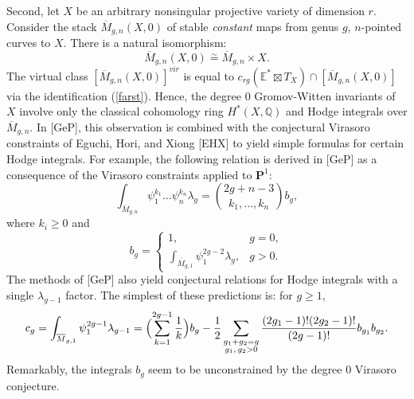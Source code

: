 \documentclass[11 pt]{amsart}
\newcommand{\proj}{\mathbf P}
\newcommand{\Q}{\mathbb{Q}}
\newcommand{\eqq}{\stackrel{\sim}{=}}
\newcommand{\mgn}{\overline{M}_{g,n}}
\newcommand{\hodge}{\mathbb{E}}
\begin{document}
Second, let $X$ be an arbitrary nonsingular projective
variety of dimension $r$. Consider the stack $\overline{M}_{g,n}(X, 0)$
of stable {\em constant} maps from genus $g$, $n$-pointed curves to $X$.
There is a natural isomorphism:
\begin{equation}
\label{farst}
\overline{M}_{g,n}(X, 0) \eqq \mgn \times X.
\end{equation}
The virtual class $[\overline{M}_{g,n}(X, 0)]^{{vir}}$
is equal to $c_{rg}(\hodge^* \boxtimes T_X) \cap [ \overline{M}_{g,n}(X, 0)]$
via the identification (\ref{farst}). 
Hence, the degree $0$ Gromov-Witten invariants of $X$ involve only
the classical cohomology ring $H^*(X, \Q)$ and Hodge integrals
over $\mgn$. 
In [GeP], this observation is combined with the conjectural
Virasoro constraints 
of Eguchi, Hori, and Xiong [EHX] to yield 
simple formulas for certain Hodge
integrals. For example, the following relation is derived in
[GeP] as a consequence of the Virasoro constraints applied to
$\proj^1$:
\begin{equation} \label{lamg}
\int_{\mgn} \psi_1^{k_1} \dots \psi_n^{k_n} \lambda_g =
\binom{2g+n-3}{k_1,\ldots, k_n} b_g ,
\end{equation}
where $k_i\geq 0$ and
\begin{equation}
\label{qwq}
b_g = \begin{cases} 1 , & g=0 , \\ \displaystyle 
\int_{{\overline{M}}_{g,1}}
\psi_1^{2g-2} \lambda_g , & g>0.
\end{cases}
\end{equation}
The methods of [GeP] also yield conjectural relations for Hodge integrals
with a single $\lambda_{g-1}$ factor. The simplest of these predictions is:
for $g\geq 1$,
\begin{equation}
\label{ihop}
c_g = \int_{\overline{M}_{g,1}} \psi_1^{2g-1} \lambda_{g-1} = \Bigl(
\sum_{k=1}^{2g-1} \frac{1}{k} \Bigr) b_g - \frac12 
\sum_{\substack{g_1+g_2=g\\g_1,\,g_2>0}}
\frac{(2g_1-1)! (2g_2-1)!}{(2g-1)!} b_{g_1} b_{g_2}.
\end{equation}
Remarkably, the integrals $b_g$ seem to be unconstrained by the
degree 0 Virasoro conjecture.
\end{document}

